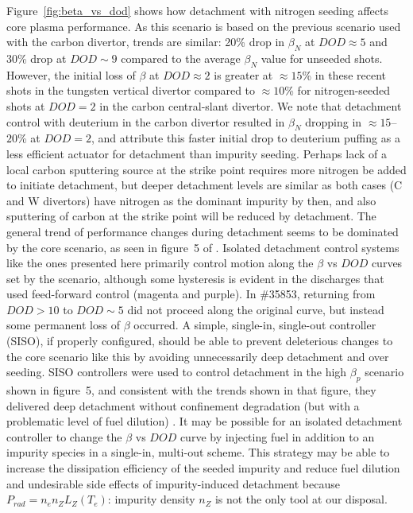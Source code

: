 \documentclass[10pt]{iopart}
\begin{document}
Figure~\ref{fig:beta_vs_dod} shows how detachment with nitrogen seeding affects core plasma performance.
As this scenario is based on the previous scenario used with the carbon divertor, trends are similar: 20\% drop in $\beta_N$ at $DOD\approx 5$ and 30\% drop at $DOD\sim 9$ compared to the average $\beta_N$ value for unseeded shots.
However, the initial loss of $\beta$ at $DOD\approx 2$ is greater at $\approx 15$\% in these recent shots in the tungsten vertical divertor compared to $\approx 10$\% for nitrogen-seeded shots at $DOD=2$ in the carbon central-slant divertor.
We note that detachment control with deuterium in the carbon divertor resulted in $\beta_N$ dropping in $\approx 15$--$20$\% at $DOD=2$, and attribute this faster initial drop to deuterium puffing as a less efficient actuator for detachment than impurity seeding.
Perhaps lack of a local carbon sputtering source at the strike point requires more nitrogen be added to initiate detachment, but deeper detachment levels are similar as both cases (C and W divertors) have nitrogen as the dominant impurity by then, and also sputtering of carbon at the strike point will be reduced by detachment.
The general trend of performance changes during detachment seems to be dominated by the core scenario, as seen in figure~5 of \cite{wang_2021_pop}.
Isolated detachment control systems like the ones presented here primarily control motion along the $\beta$ vs $DOD$ curves set by the scenario, although some hysteresis is evident in the discharges that used feed-forward control (magenta and purple).
In \#35853, returning from $DOD>10$ to $DOD\sim5$ did not proceed along the original curve, but instead some permanent loss of $\beta$ occurred.
A simple, single-in, single-out controller (SISO), if properly configured, should be able to prevent deleterious changes to the core scenario like this by avoiding unnecessarily deep detachment and over seeding.
SISO controllers were used to control detachment in the high $\beta_p$ scenario shown in \cite{wang_2021_pop} figure~5, and consistent with the trends shown in that figure, they delivered deep detachment without confinement degradation (but with a problematic level of fuel dilution) \cite{Eldon_2021_NME}.
It may be possible for an isolated detachment controller to change the $\beta$ vs $DOD$ curve by injecting fuel in addition to an impurity species in a single-in, multi-out scheme.
This strategy may be able to increase the dissipation efficiency of the seeded impurity and reduce fuel dilution and undesirable side effects of impurity-induced detachment because $P_{rad}=n_e n_Z L_Z(T_e)$: impurity density $n_Z$ is not the only tool at our disposal.
\end{document}
